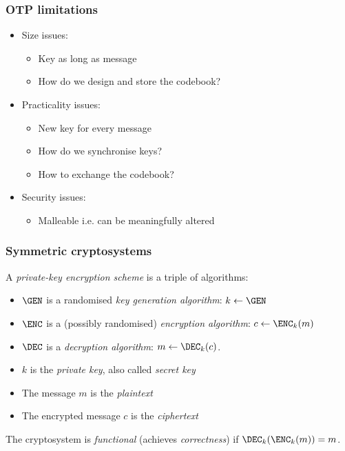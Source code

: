\begin{frame}
  \frametitle{OTP limitations}

  \pause
  \begin{itemize}[<+->]
    \item Size issues:
    \begin{itemize}
      \item Key as long as message
      \item How do we design and store the codebook?
    \end{itemize}
    \item Practicality issues: 
    \begin{itemize}
      \item New key for every message
      \item How do we synchronise keys?
      \item How to exchange the codebook?
    \end{itemize}
    \item Security issues:
    \begin{itemize}
      \item Malleable i.e. can be meaningfully altered
    \end{itemize}
  \end{itemize}
\end{frame}

\begin{frame}
  \frametitle{Symmetric cryptosystems}

  A \emph{private-key encryption scheme} is a triple of algorithms:
  \begin{itemize}
    \pause\item $\GEN$ is a randomised \emph{key generation algorithm}: $k\gets\GEN$
    \pause\item $\ENC$ is a (possibly randomised) \emph{encryption algorithm}: $c\gets\ENC_k(m)$
    \pause\item $\DEC$ is a \emph{decryption algorithm}: $m\gets\DEC_k(c)$.
  \end{itemize}

  \vspace*{1em}

  \begin{itemize}
    \pause\item $k$ is the \emph{private key}, also called \emph{secret key}
    \pause\item The message $m$ is the \emph{plaintext}
    \pause\item The encrypted message $c$ is the \emph{ciphertext}
  \end{itemize}

  \vspace*{1em}

  \pause
  The cryptosystem is \emph{functional} (achieves \emph{correctness}) if $\DEC_k(\ENC_k(m))=m$.
\end{frame}

